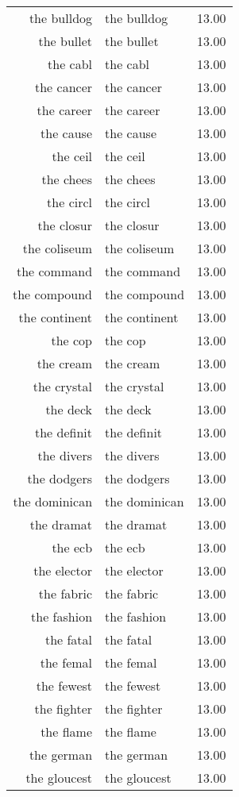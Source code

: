 \begin{table}[ht]
\begin{tabular}{rlr}
  the bulldog & the bulldog & 13.00 \\ 
  the bullet & the bullet & 13.00 \\ 
  the cabl & the cabl & 13.00 \\ 
  the cancer & the cancer & 13.00 \\ 
  the career & the career & 13.00 \\ 
  the cause & the cause & 13.00 \\ 
  the ceil & the ceil & 13.00 \\ 
  the chees & the chees & 13.00 \\ 
  the circl & the circl & 13.00 \\ 
  the closur & the closur & 13.00 \\ 
  the coliseum & the coliseum & 13.00 \\ 
  the command & the command & 13.00 \\ 
  the compound & the compound & 13.00 \\ 
  the continent & the continent & 13.00 \\ 
  the cop & the cop & 13.00 \\ 
  the cream & the cream & 13.00 \\ 
  the crystal & the crystal & 13.00 \\ 
  the deck & the deck & 13.00 \\ 
  the definit & the definit & 13.00 \\ 
  the divers & the divers & 13.00 \\ 
  the dodgers & the dodgers & 13.00 \\ 
  the dominican & the dominican & 13.00 \\ 
  the dramat & the dramat & 13.00 \\ 
  the ecb & the ecb & 13.00 \\ 
  the elector & the elector & 13.00 \\ 
  the fabric & the fabric & 13.00 \\ 
  the fashion & the fashion & 13.00 \\ 
  the fatal & the fatal & 13.00 \\ 
  the femal & the femal & 13.00 \\ 
  the fewest & the fewest & 13.00 \\ 
  the fighter & the fighter & 13.00 \\ 
  the flame & the flame & 13.00 \\ 
  the german & the german & 13.00 \\ 
  the gloucest & the gloucest & 13.00 \\ 

\end{tabular}
\end{table}
